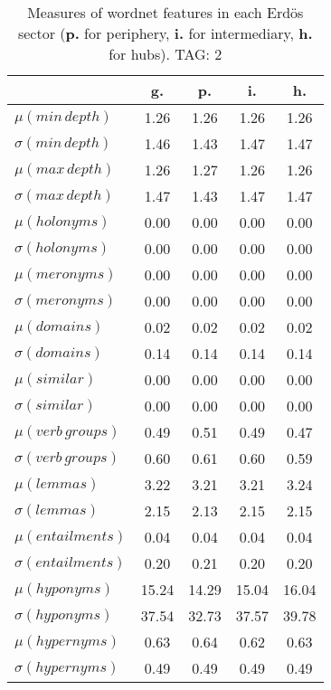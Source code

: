 \begin{table}[h!]
\begin{center}
\begin{tabular}{| l || c | c | c | c |}\hline
 & {\bf g.} & {\bf p.} & {\bf i.} & {\bf h.} \\\hline\hline
$\mu(min\,depth)$ & 1.26  & 1.26  & 1.26  & 1.26 \\
$\sigma(min\,depth)$ & 1.46  & 1.43  & 1.47  & 1.47 \\\hline
$\mu(max\,depth)$ & 1.26  & 1.27  & 1.26  & 1.26 \\
$\sigma(max\,depth)$ & 1.47  & 1.43  & 1.47  & 1.47 \\\hline
$\mu(holonyms)$ & 0.00  & 0.00  & 0.00  & 0.00 \\
$\sigma(holonyms)$ & 0.00  & 0.00  & 0.00  & 0.00 \\\hline
$\mu(meronyms)$ & 0.00  & 0.00  & 0.00  & 0.00 \\
$\sigma(meronyms)$ & 0.00  & 0.00  & 0.00  & 0.00 \\\hline
$\mu(domains)$ & 0.02  & 0.02  & 0.02  & 0.02 \\
$\sigma(domains)$ & 0.14  & 0.14  & 0.14  & 0.14 \\\hline
$\mu(similar)$ & 0.00  & 0.00  & 0.00  & 0.00 \\
$\sigma(similar)$ & 0.00  & 0.00  & 0.00  & 0.00 \\\hline
$\mu(verb\,groups)$ & 0.49  & 0.51  & 0.49  & 0.47 \\
$\sigma(verb\,groups)$ & 0.60  & 0.61  & 0.60  & 0.59 \\\hline
$\mu(lemmas)$ & 3.22  & 3.21  & 3.21  & 3.24 \\
$\sigma(lemmas)$ & 2.15  & 2.13  & 2.15  & 2.15 \\\hline
$\mu(entailments)$ & 0.04  & 0.04  & 0.04  & 0.04 \\
$\sigma(entailments)$ & 0.20  & 0.21  & 0.20  & 0.20 \\\hline
$\mu(hyponyms)$ & 15.24  & 14.29  & 15.04  & 16.04 \\
$\sigma(hyponyms)$ & 37.54  & 32.73  & 37.57  & 39.78 \\\hline
$\mu(hypernyms)$ & 0.63  & 0.64  & 0.62  & 0.63 \\
$\sigma(hypernyms)$ & 0.49  & 0.49  & 0.49  & 0.49 \\\hline
\end{tabular}
\caption{Measures of wordnet features in each Erd\"os sector ({{\bf p.}} for periphery, {{\bf i.}} for intermediary, {{\bf h.}} for hubs). TAG: 2}
\end{center}
\end{table}